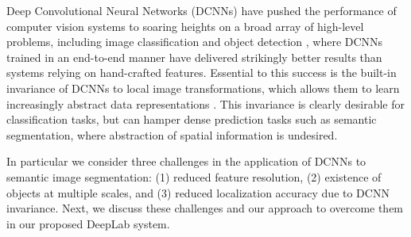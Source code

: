 
Deep Convolutional Neural Networks (DCNNs) \cite{LeCun1998} have 
pushed the performance of computer vision systems to soaring heights on a
broad array of high-level problems, including image classification
\cite{KrizhevskyNIPS2013, sermanet2013overfeat, simonyan2014very,
  szegedy2014going, papandreou2014untangling} and object detection
\cite{girshick2014rcnn, erhan2014scalable, girshick2015fast, ren2015faster,
  he2015deep, liu2015ssd}, where DCNNs trained
in an end-to-end manner have delivered strikingly better results than systems relying
on hand-crafted features.
%
Essential to this success is the built-in invariance of DCNNs
to local image transformations, which allows them to learn increasingly
 abstract data representations \cite{zeiler2014visualizing}. This
invariance is clearly desirable for classification tasks, but can hamper
dense prediction tasks such as semantic segmentation, where abstraction of spatial
information is undesired.

In particular we consider three challenges in the application of DCNNs to semantic image segmentation: (1) reduced feature resolution,
(2) existence of objects at multiple scales, and (3) reduced localization
accuracy due to DCNN invariance. Next, we discuss these challenges and our
approach to overcome them in our proposed DeepLab system.


